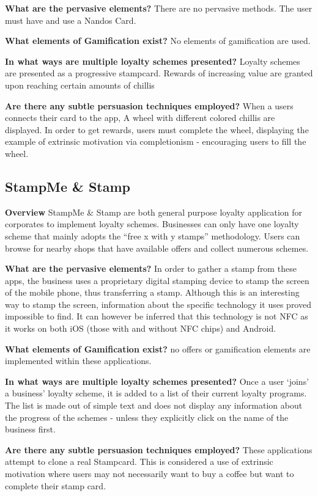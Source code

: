 \textbf{What are the pervasive elements?} There are no pervasive methods. The user must have and use a Nandos Card.

\textbf{What elements of Gamification exist?}
No elements of gamification are used.

\textbf{In what ways are multiple loyalty schemes presented?}
Loyalty schemes are presented as a progressive stampcard. Rewards of increasing value are granted upon reaching certain amounts of chillis

\textbf{Are there any subtle persuasion techniques employed?}
When a users connects their card to the app, A wheel with different colored chillis are displayed. In order to get rewards, users must complete the wheel, displaying the example of extrinsic motivation via completionism - encouraging users to fill the wheel. 
\subsection{StampMe \& Stamp}

\textbf{Overview}
StampMe \& Stamp are both general purpose loyalty application for corporates to implement loyalty schemes. Businesses can only have one loyalty scheme that mainly adopts the ``free x with y stamps'' methodology. Users can browse for nearby shops that have available offers and collect numerous schemes.

\textbf{What are the pervasive elements?}
In order to gather a stamp from these apps, the business uses a proprietary digital stamping device to stamp the screen of the mobile phone, thus transferring a stamp. Although this is an interesting way to stamp the screen, information about the specific technology it uses proved impossible to find. It can however be inferred that this technology is not NFC as it works on both iOS (those with and without NFC chips) and Android.

\textbf{What elements of Gamification exist?}
no offers or gamification elements are implemented within these applications. 

\textbf{In what ways are multiple loyalty schemes presented?}
Once a user `joins' a business' loyalty scheme, it is added to a list of their current loyalty programs. The list is made out of simple text and does not display any information about the progress of the schemes - unless they explicitly click on the name of the business first.

\textbf{Are there any subtle persuasion techniques employed?}
These applications attempt to clone a real Stampcard. This is considered a use of extrinsic motivation where users may not necessarily want to buy a coffee but want to complete their stamp card. 
\newpage

